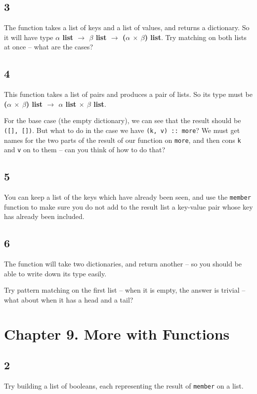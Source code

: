 \documentclass[]{book}
\begin{document}
\subsection*{3}
The function takes a list of keys and a list of values, and returns a dictionary. So it will have type \textbf{\textsf{$\alpha$ list $\rightarrow$ $\beta$ list $\rightarrow$ \textmd{(}$\alpha$ $\times$ $\beta$\textmd{)} list}}. Try matching on both lists at once -- what are the cases?

\subsection*{4}
This function takes a list of pairs and produces a pair of lists. So its type must be \textsf{\textbf{\textmd{(}$\alpha$ $\times$ $\beta$\textmd{)} list $\rightarrow$ $\alpha$ list $\times$ $\beta$ list}}.

For the base case (the empty dictionary), we can see that the result should be \texttt{([], [])}. But what to do in the case we have \texttt{(k, v) :: more}? We must get names for the two parts of the result of our function on \texttt{more}, and then cons \texttt{k} and \texttt{v} on to them -- can you think of how to do that?

\subsection*{5}
You can keep a list of the keys which have already been seen, and use the \texttt{member} function to make sure you do not add to the result list a key-value pair whose key has already been included.

\subsection*{6}
The function will take two dictionaries, and return another -- so you should be able to write down its type easily.

Try pattern matching on the first list -- when it is empty, the answer is trivial -- what about when it has a head and a tail?

\section*{Chapter 9. More with Functions}

\subsection*{2}
Try building a list of booleans, each representing the result of \texttt{member} on a list.
\end{document}

